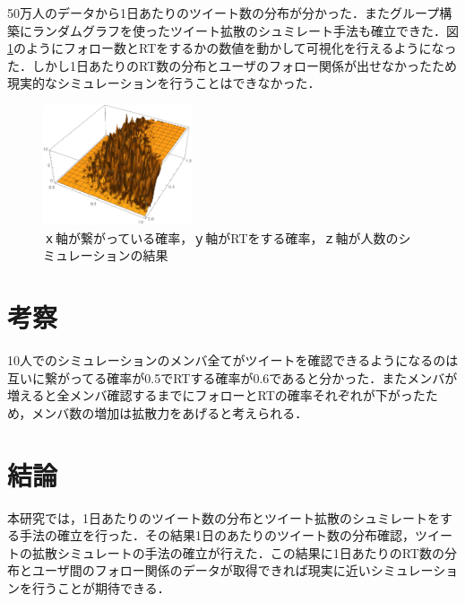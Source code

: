 \documentclass[uplatex,twocolumn,dvipdfmx]{jsarticle}
\begin{document}
50万人のデータから1日あたりのツイート数の分布が分かった．またグループ構築にランダムグラフを使ったツイート拡散のシュミレート手法も確立できた．図\ref{何人がRTを見るか}のようにフォロー数とRTをするかの数値を動かして可視化を行えるようになった．しかし1日あたりのRT数の分布とユーザのフォロー関係が出せなかったため現実的なシミュレーションを行うことはできなかった．

\begin{figure}[htb]
\centering
\includegraphics[width=44mm,clip]{result.pdf}
\caption{ｘ軸が繋がっている確率，ｙ軸がRTをする確率，ｚ軸が人数のシミュレーションの結果}\label{何人がRTを見るか}
\end{figure}

\section{考察}

10人でのシミュレーションのメンバ全てがツイートを確認できるようになるのは互いに繋がってる確率が0.5でRTする確率が0.6であると分かった．またメンバが増えると全メンバ確認するまでにフォローとRTの確率それぞれが下がったため，メンバ数の増加は拡散力をあげると考えられる．

\section{結論}

本研究では，1日あたりのツイート数の分布とツイート拡散のシュミレートをする手法の確立を行った．その結果1日のあたりのツイート数の分布確認，ツイートの拡散シミュレートの手法の確立が行えた．この結果に1日あたりのRT数の分布とユーザ間のフォロー関係のデータが取得できれば現実に近いシミュレーションを行うことが期待できる．


\end{document}
